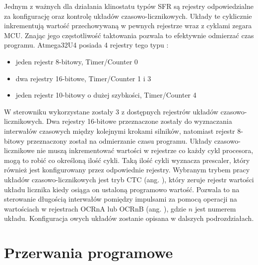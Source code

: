 Jednym z ważnych dla działania klinostatu typów SFR są rejestry odpowiedzialne za konfigurację oraz kontrolę układów czasowo-licznikowych. Układy \linebreak te cyklicznie inkrementują wartość przechowywaną w pewnych rejestrze wraz \linebreak z cyklami zegara MCU. Znając jego częstotliwość taktowania pozwala to efektywnie odmierzać czas programu. Atmega32U4 posiada 4 rejestry tego typu \cite{bib:nota_katalogowa}: 
\begin{itemize}
	\item jeden rejestr 8-bitowy, Timer/Counter 0
	\item dwa rejestry 16-bitowe, Timer/Counter 1 i 3
	\item jeden rejestr 10-bitowy o dużej szybkości, Timer/Counter 4
\end{itemize}

W sterowniku wykorzystane zostały 3 z dostępnych rejestrów układów czasowo-licznikowych. Dwa rejestry 16-bitowe przeznaczone zostały do wyznaczania interwałów czasowych między kolejnymi krokami silników, natomiast rejestr 8-bitowy przeznaczony został na odmierzanie czasu programu. Układy czasowo-licznikowe nie muszą inkrementować wartości w rejestrze co każdy cykl procesora, mogą \linebreak to robić co określoną ilość cykli. Taką ilość cykli wyznacza prescaler, który również jest konfigurowany przez odpowiednie rejestry. Wybranym trybem pracy układów czasowo-licznikowych jest tryb CTC (ang. ), który zeruje rejestr wartości układu licznika kiedy osiąga on ustaloną programowo wartość. Pozwala to na sterowanie długością interwałów pomiędzy impulsami za pomocą operacji na wartościach w  rejestrach OCRnA lub OCRnB (ang. ), gdzie $n$ jest numerem układu. Konfiguracja owych układów zostanie opisana w dalszych podrozdziałach.

\section{Przerwania programowe}


